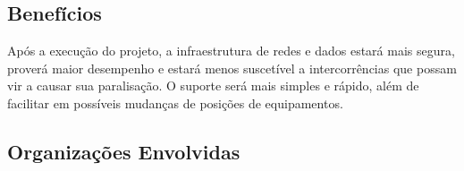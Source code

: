 \documentclass[	DIV=calc,%
							paper=a4,%
							fontsize=12pt,%
							onecolumn]{scrartcl}	 					%
\begin{document}
\subsection{Benefícios}
Após a execução do projeto, a infraestrutura de redes e dados estará mais segura, proverá maior desempenho e estará menos suscetível a intercorrências que possam vir a causar sua paralisação. O suporte será mais simples e rápido, além de facilitar em possíveis mudanças de posições de equipamentos.

\subsection{Organizações Envolvidas}

\end{document}
